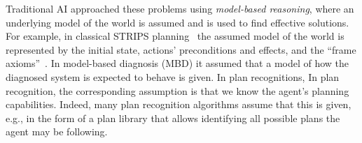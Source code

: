 \documentclass[12pt]{article}
\begin{document}



Traditional AI approached these problems using {\em model-based reasoning}, where an underlying model of the world is assumed and is used to find effective solutions. For example, in classical STRIPS planning~\cite{fikes1971strips} the assumed model of the world is  represented by the initial state, actions' preconditions and effects, and the ``frame axioms''~\cite{ghallab2004automated}. 
In model-based diagnosis (MBD) it assumed that a model of how the diagnosed system is expected to behave is given. In plan recognitions, In plan recognition, the corresponding assumption is that we know the agent's planning capabilities. Indeed, many plan recognition algorithms assume that this is given, e.g., in the form of a plan library that allows identifying all possible plans the agent may be following. %

\end{document}
